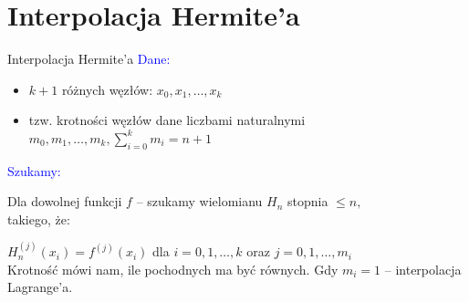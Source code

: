 \section{Interpolacja Hermite'a}


%
\begin{frame}{Interpolacja Hermite'a}
\textcolor{blue}{Dane:}
\begin{itemize}
\item $k+1$ różnych węzłów: $x_{0}, x_{1}, \dots, x_{k}$

\item tzw. krotności węzłów dane liczbami naturalnymi $m_{0}, m_{1},\dots , m_{k}, \displaystyle \sum_{i=0}^{k}m_{i}=n+1$
\end{itemize}
\textcolor{blue}{Szukamy:}

Dla dowolnej funkcji $f$ -- szukamy wielomianu $H_{n}$ stopnia $\leq n,$ \\
takiego, że:

$H_{n}^{(j)}(x_{i})=f^{(j)}(x_{i})$ \quad dla $i=0, 1, \dots , k$ oraz
$j=0, 1, \dots, m_{i}$\\
\vspace{0.5cm}
Krotność mówi nam, ile pochodnych ma być równych.
Gdy $m_{i}=1$ -- interpolacja Lagrange'a.
\end{frame}

